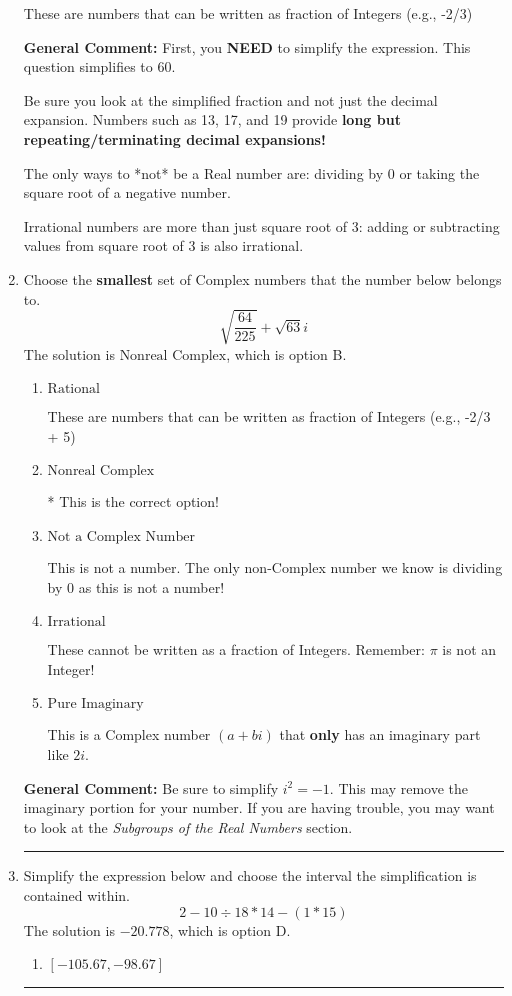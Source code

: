 \documentclass{extbook}[14pt]
\newcommand{\litem}[1]{\item #1

\rule{\textwidth}{0.4pt}}
\begin{document}
\begin{enumerate}
{\begin{enumerate}[label=\Alph*.]
These are numbers that can be written as fraction of Integers (e.g., -2/3)
\end{enumerate}

\textbf{General Comment:} First, you \textbf{NEED} to simplify the expression. This question simplifies to $60$. 
 
 Be sure you look at the simplified fraction and not just the decimal expansion. Numbers such as 13, 17, and 19 provide \textbf{long but repeating/terminating decimal expansions!} 
 
 The only ways to *not* be a Real number are: dividing by 0 or taking the square root of a negative number. 
 
 Irrational numbers are more than just square root of 3: adding or subtracting values from square root of 3 is also irrational.
}
\litem{
Choose the \textbf{smallest} set of Complex numbers that the number below belongs to.
\[ \sqrt{\frac{64}{225}}+\sqrt{63} i \]
The solution is \( \text{Nonreal Complex} \), which is option B.\begin{enumerate}[label=\Alph*.]
\item \( \text{Rational} \)

These are numbers that can be written as fraction of Integers (e.g., -2/3 + 5)
\item \( \text{Nonreal Complex} \)

* This is the correct option!
\item \( \text{Not a Complex Number} \)

This is not a number. The only non-Complex number we know is dividing by 0 as this is not a number!
\item \( \text{Irrational} \)

These cannot be written as a fraction of Integers. Remember: $\pi$ is not an Integer!
\item \( \text{Pure Imaginary} \)

This is a Complex number $(a+bi)$ that \textbf{only} has an imaginary part like $2i$.
\end{enumerate}

\textbf{General Comment:} Be sure to simplify $i^2 = -1$. This may remove the imaginary portion for your number. If you are having trouble, you may want to look at the \textit{Subgroups of the Real Numbers} section.
}
\litem{
Simplify the expression below and choose the interval the simplification is contained within.
\[ 2 - 10 \div 18 * 14 - (1 * 15) \]
The solution is \( -20.778 \), which is option D.\begin{enumerate}[label=\Alph*.]
\item \( [-105.67, -98.67] \)


\end{enumerate}}
\end{enumerate}
\end{document}
